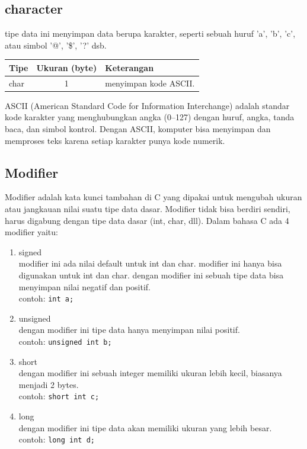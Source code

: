 \subsection{character}

tipe data ini menyimpan data berupa karakter, seperti sebuah huruf 'a', 'b', 'c', atau simbol '@', '\$', '?' dsb.
\begin{center}
	\begin{tabular}{|l|c|l|}
		\hline
		\textbf{Tipe} & \textbf{Ukuran (byte)} & \textbf{Keterangan} \\
		\hline
		char & 1	& menyimpan kode ASCII. \\
		\hline
	\end{tabular}
\end{center}
ASCII (American Standard Code for Information Interchange) adalah standar kode karakter yang menghubungkan angka (0–127) dengan huruf, angka, tanda baca, dan simbol kontrol.
Dengan ASCII, komputer bisa menyimpan dan memproses teks karena setiap karakter punya kode numerik.

\subsection{Modifier}
Modifier adalah kata kunci tambahan di C yang dipakai untuk mengubah ukuran atau jangkauan nilai suatu tipe data dasar.
Modifier tidak bisa berdiri sendiri, harus digabung dengan tipe data dasar (int, char, dll).
Dalam bahasa C ada 4 modifier yaitu:
\begin{enumerate}
	\item signed \\
	modifier ini ada nilai default untuk int dan char. modifier ini hanya bisa digunakan untuk int dan char.
	dengan modifier ini sebuah tipe data bisa menyimpan nilai negatif dan positif.
    \\ contoh: \texttt{int a;}
	\item unsigned \\
    dengan modifier ini tipe data hanya menyimpan nilai positif.
	\\ contoh: \texttt{unsigned int b;}
    \item short \\
    dengan modifier ini sebuah integer memiliki ukuran lebih kecil, biasanya menjadi 2 bytes.
    \\ contoh: \texttt{short int c;} 
	\item long \\
    dengan modifier ini tipe data akan memiliki ukuran yang lebih besar.
	\\ contoh: \texttt{long int d;}
\end{enumerate}

